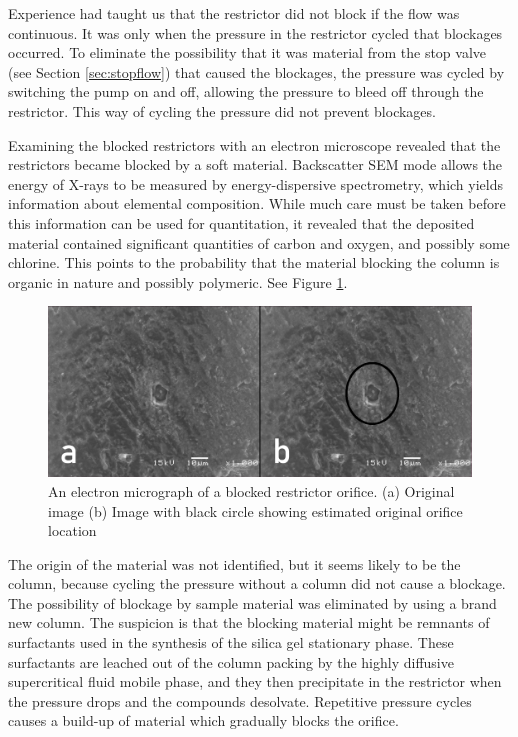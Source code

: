 Experience had taught us that the restrictor did not block if the flow was
continuous. It was only when the pressure in the restrictor cycled that
blockages occurred. To eliminate the possibility that it was material from the
stop valve (see Section \ref{sec:stopflow}) that caused the blockages, the
pressure was cycled by switching the pump on and off, allowing the pressure to
bleed off through the restrictor. This way of cycling the pressure did not
prevent blockages.

Examining the blocked restrictors with an electron microscope revealed that the
restrictors became blocked by a soft material. Backscatter SEM mode allows the
energy of X-rays to be measured by energy-dispersive spectrometry, which yields
information about elemental composition. While much care must be taken before
this information can be used for quantitation, it revealed that the deposited
material contained significant quantities of carbon and oxygen, and possibly
some chlorine. This points to the probability that the material blocking the
column is organic in nature and possibly polymeric. See Figure
\ref{fig:restrictorblockage}.

\begin{figure}
\centering
\includegraphics[width=\textwidth]{Figures/Blockage_1920.png}
\decoRule

\caption[A electron microscope photo of a blocked restrictor orifice]{An
electron micrograph of a blocked restrictor orifice. (a) Original
image (b) Image with black circle showing estimated original orifice location}

\label{fig:restrictorblockage}
\end{figure}

The origin of the material was not identified, but it seems likely to be the
column, because cycling the pressure without a column did not cause a blockage.
The possibility of blockage by sample material was eliminated by using a brand
new column. The suspicion is that the blocking material might be remnants of
surfactants used in the synthesis of the silica gel stationary phase. These
surfactants are leached out of the column packing by the highly diffusive
supercritical fluid mobile phase, and they then precipitate in the restrictor
when the pressure drops and the compounds desolvate. Repetitive pressure cycles
causes a build-up of material which gradually blocks the orifice.

